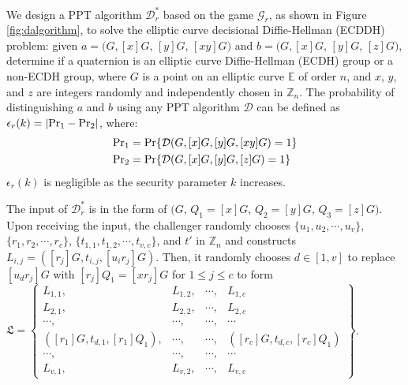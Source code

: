 {{{{%

We design a PPT algorithm $\mathcal{D}^*_r$ based on the game $\mathcal{G}_r$, as shown in Figure \ref{fig:dalgorithm}, to solve the elliptic curve decisional Diffie-Hellman (ECDDH) problem: given $a=(G, [x]G$, $[y]G$, $[xy]G)$ and $b=(G, [x]G$, $[y]G$, $[z]G)$, determine if a quaternion is an elliptic curve Diffie-Hellman (ECDH) group or a non-ECDH group, where $G$ is a point on an elliptic curve $\mathbb{E}$ of order $n$, and $x$, $y$, and $z$ are integers randomly and independently chosen in $\mathbb{Z}_n$. The probability of distinguishing $a$ and $b$ using any PPT algorithm $\mathcal{D}$ can be defined as $\epsilon_{r}(k) = |{\rm Pr}_1 - {\rm Pr}_2|$, where: %
\begin{align*}
&{\rm Pr}_1 =  {\rm Pr}\{\mathcal{D}(G, [x]G, [y]G, [xy]G)=1\} \\
&{\rm Pr}_2 =  {\rm Pr}\{\mathcal{D}(G, [x]G, [y]G, [z]G)=1\}
\end{align*}
$\epsilon_{r}(k)$ is negligible as the security parameter $k$ increases.

%


The input of $\mathcal{D}^*_r$ is in the form of $(G$, $Q_1=[x]G$, $Q_2=[y]G$, $Q_3=[z]G)$. Upon receiving the input, the challenger randomly chooses $\{u_1, u_2, \cdots, u_v\}$, $\{r_1, r_2, \cdots, r_c\}$, $\{t_{1, 1}, t_{1, 2}, \cdots, t_{v, c}\}$, and $t'$ in $\mathbb{Z}_n$ and constructs $L_{i, j} = ([r_j]G, t_{i, j}, [u_ir_j]G)$. Then, it randomly chooses $d \in [1, v]$ to replace $[u_d r_j]G$ with $[r_j]Q_1=[xr_j]G$ for $1\leq j \leq c$ to form $\mathfrak{L}=\left \{ \begin{matrix}
L_{1,1},&L_{1,2},&\cdots,&L_{1,c}\\
L_{2,1},& L_{2,2},&\cdots,&L_{2,c}\\
\cdots,&\cdots,&\cdots,&\cdots\\
([r_{1}]G, t_{d, 1}, [r_{1}]Q_1),&\cdots,&\cdots,&([r_{c}]G, t_{d, c}, [r_{c}]Q_1)\\
\cdots,&\cdots,&\cdots,&\cdots\\
L_{v,1},&L_{v,2},&\cdots,&L_{v,c}
\end{matrix}\right\}$.

}}}}
